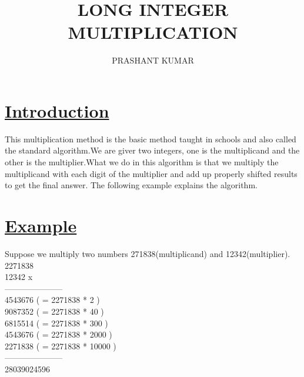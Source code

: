 \documentclass[11pt]{article}
\title{LONG INTEGER MULTIPLICATION}
\author{PRASHANT KUMAR}
\begin{document}
\maketitle
\section*{\underline{Introduction}}
This multiplication method is the basic method taught in schools and also called the standard algorithm.We are giver two integers, one is the multiplicand and the other is the multiplier.What we do in this algorithm is that we multiply the multiplicand with each digit of the multiplier and add up properly shifted results to get the final answer. The following example explains the algorithm.
\section*{\underline{Example}}
Suppose we multiply two numbers 271838(multiplicand) and 12342(multiplier).\\

\hspace*{4.4 cm}      2271838\\
\hspace*{5.4 cm}    12342 x\\
\hspace*{4 cm}      ---------------------  \\
\hspace*{5 cm}      4543676 \hspace{1 cm}( = 2271838 * 2 )\\
\hspace*{4.8 cm}    9087352	\hspace{1.2 cm}( = 2271838 * 40 )\\
\hspace*{4.5 cm}	6815514 \hspace{1.5 cm}( = 2271838 * 300 )\\
\hspace*{4.3 cm}    4543676 \hspace{1.7 cm}( = 2271838 * 2000 )\\
\hspace*{4.1 cm}	2271838 \hspace{1.9 cm}( = 2271838 * 10000 )\\
\hspace*{4 cm}      ---------------------  \\
\hspace*{4.1 cm}    28039024596\\
\end{document}
